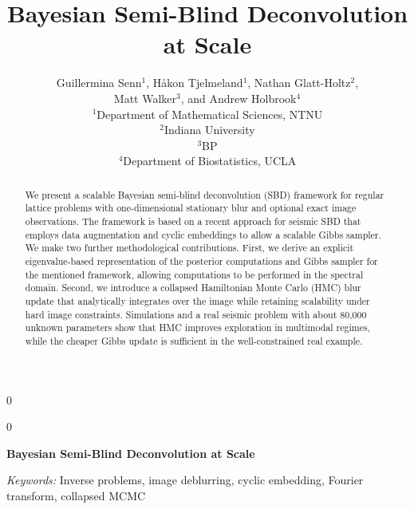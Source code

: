 \documentclass[12pt]{article}
\newcommand{\anon}{0}
\begin{document}
\def\spacingset#1{\renewcommand{\baselinestretch}%
{#1}\small\normalsize} \spacingset{1}



\anon
{
  \title{Bayesian Semi-Blind Deconvolution at Scale}
  \author{
    Guillermina Senn$^{1}$,
    Håkon Tjelmeland$^{1}$,
    Nathan Glatt-Holtz$^{2}$, \\
    Matt Walker$^{3}$,
    and Andrew Holbrook$^{4}$\\[0.5em]
    $^{1}$Department of Mathematical Sciences, NTNU\\
    $^{2}$Indiana University\\
    $^{3}$BP\\
    $^{4}$Department of Biostatistics, UCLA
    }
    \date{}
  \maketitle
} \fi

\anon
{
  \bigskip
  \bigskip
  \bigskip
  \begin{center}
    {\LARGE\bf Bayesian Semi-Blind Deconvolution at Scale}
    \end{center}
  \medskip
} \fi

\bigskip

\begin{abstract}
We present a scalable Bayesian semi-blind deconvolution (SBD) framework for regular lattice problems with one-dimensional stationary blur and optional exact image observations. 
The framework is based on a recent approach for seismic SBD that employs data augmentation and cyclic embeddings to allow a scalable Gibbs sampler. 
We make two further methodological contributions. 
First, we derive an explicit eigenvalue-based representation of the posterior computations and Gibbs sampler for the mentioned framework, allowing computations to be performed in the spectral domain. 
Second, we introduce a collapsed Hamiltonian Monte Carlo (HMC) blur update that analytically integrates over the image while retaining scalability under hard image constraints. Simulations and a real seismic problem with about 80{,}000 unknown parameters show that HMC improves exploration in multimodal regimes, while the cheaper Gibbs update is sufficient in the well-constrained real example.
\end{abstract}

\noindent
{\it Keywords:} Inverse problems, image deblurring, cyclic embedding, Fourier transform, collapsed MCMC
\vfill
\end{document}
